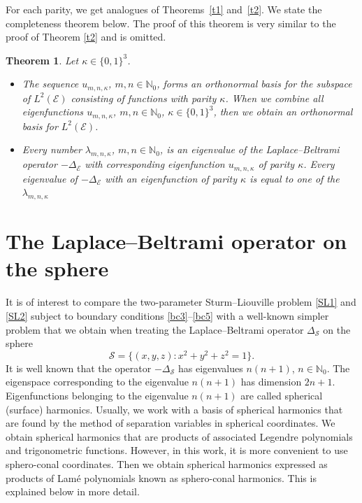 \documentclass[10pt,a4paper]{amsart}
\newtheorem{thm}{Theorem}[section]
\newcommand{\N}{\mathbb{N}}
\newcommand{\E}{\mathcal{E}}
\newcommand{\Sp}{\mathcal{S}}
\newcommand{\D}{\Delta_\E}
\numberwithin{equation}{section}
\begin{document}
For each parity, we get analogues of Theorems~\ref{t1} and~\ref{t2}.
We state the completeness theorem below. The proof of this theorem is very similar to the proof of Theorem \ref{t2} and is omitted.

\begin{thm}%
Let $\kappa\in \{0,1\}^3$.
\begin{itemize}\itemsep=0pt
\item[$(i)$]
The sequence $u_{m,n,\kappa}$, $m,n\in\N_0$,
forms an orthonormal basis for the subspace of $L^2(\E)$ consisting of functions with parity $\kappa$.
When we combine all eigenfunctions $u_{m,n,\kappa}$, ${m,n\in\N_0}$, $\kappa\in\{0,1\}^3$, then we obtain an orthonormal basis for
$L^2(\E)$.

\item[$(ii)$]
Every number $\lambda_{m,n,\kappa}$, $m,n\in\N_0$, is an eigenvalue of the Laplace--Beltrami operator $-\D$
with corresponding eigenfunction $u_{m,n,\kappa}$ of parity $\kappa$.
Every eigenvalue of $-\D$ with an eigenfunction of parity $\kappa$ is equal to one of the $\lambda_{m,n,\kappa}$
\end{itemize}
\end{thm}

\section{The Laplace--Beltrami operator on the sphere}\label{sphere}

It is of interest to compare
the two-parameter Sturm--Liouville problem \eqref{SL1} and \eqref{SL2}
subject to boundary conditions \eqref{bc3}--\eqref{bc5} with a well-known simpler problem
that we obtain when treating the Laplace--Beltrami operator $\Delta_\Sp$ on the sphere
\[ \Sp=\{(x,y,z)\colon x^2+y^2+z^2=1\}.\]
It is well known that the operator $-\Delta_\Sp$ has eigenvalues $n(n+1)$, $n\in\N_0$. The eigenspace corresponding to
the eigenvalue $n(n+1)$ has dimension $2n+1$. Eigenfunctions belonging to the eigenvalue $n(n+1)$ are called spherical (surface) harmonics.
Usually, we work with a basis of spherical harmonics that are found by the method of separation variables in spherical coordinates.
We obtain spherical harmonics that are products of associated Legendre polynomials and trigonometric functions.
However, in this work, it is more convenient to
use sphero-conal coordinates. Then we obtain spherical harmonics expressed as products of Lam\'e polynomials known as sphero-conal harmonics.
This is explained below in more detail.
\end{document}
